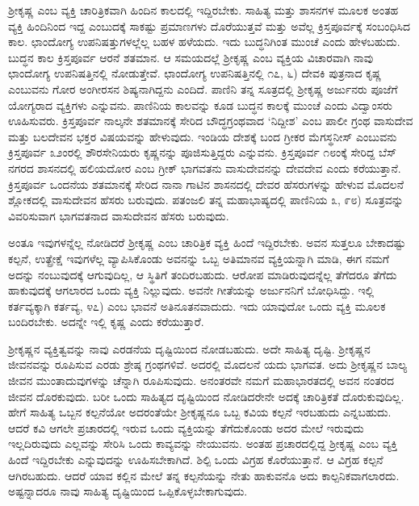 ಶ‍್ರೀಕೃಷ್ಣ ಎಂಬ ವ್ಯಕ್ತಿ ಚಾರಿತ್ರಿಕವಾಗಿ ಹಿಂದಿನ ಕಾಲದಲ್ಲಿ ಇದ್ದಿರಬೇಕು. ಸಾಹಿತ್ಯ ಮತ್ತು ಶಾಸನಗಳ ಮೂಲಕ ಅಂತಹ ವ್ಯಕ್ತಿ ಹಿಂದಿನಿಂದ ಇದ್ದ ಎಂಬುದಕ್ಕೆ ಸಾಕಷ್ಟು ಪ್ರಮಾಣಗಳು ದೊರೆಯುತ್ತವೆ ಮತ್ತು ಅವೆಲ್ಲ ಕ್ರಿಸ್ತಪೂರ್ವಕ್ಕೆ ಸಂಬಂಧಿಸಿದ ಕಾಲ. ಛಾಂದೋಗ್ಯ ಉಪನಿಷತ್ತು\-ಗಳಲ್ಲೆಲ್ಲ ಬಹಳ ಹಳೆಯದು. ಇದು ಬುದ್ಧನಿಗಿಂತ ಮುಂಚೆ ಎಂದು ಹೇಳಬಹುದು. ಬುದ್ಧನ ಕಾಲ ಕ್ರಿಸ್ತಪೂರ್ವ ಆರನೆ ಶತಮಾನ. ಆ ಸಮಯದಲ್ಲೆ ಶ‍್ರೀಕೃಷ್ಣ ಎಂಬ ವ್ಯಕ್ತಿಯ ವಿಚಾರವಾಗಿ ನಾವು ಛಾಂದೋಗ್ಯ ಉಪನಿಷತ್ತಿನಲ್ಲಿ ನೋಡುತ್ತೇವೆ. ಛಾಂದೋಗ್ಯ ಉಪನಿಷತ್ತಿನಲ್ಲಿ  ೧೭, ೬) ದೇವಕಿ ಪುತ್ರನಾದ ಕೃಷ್ಣ ಎಂಬುವನು ಗೋರ ಅಂಗೀರಸನ ಶಿಷ್ಯನಾಗಿದ್ದನು ಎಂದಿದೆ. ಪಾಣಿನಿ ತನ್ನ ಸೂತ್ರದಲ್ಲಿ ಶ‍್ರೀಕೃಷ್ಣ ಅರ್ಜುನರು ಪೂಜೆಗೆ ಯೋಗ್ಯರಾದ ವ್ಯಕ್ತಿಗಳು ಎನ್ನುವನು. ಪಾಣಿನಿಯ ಕಾಲವನ್ನು ಕೂಡ ಬುದ್ಧನ ಕಾಲಕ್ಕೆ ಮುಂಚೆ ಎಂದು ವಿದ್ವಾಂಸರು ಊಹಿಸುವರು. ಕ್ರಿಸ್ತಪೂರ್ವ ನಾಲ್ಕನೇ ಶತಮಾನಕ್ಕೆ ಸೇರಿದ ಬೌದ್ಧಗ್ರಂಥವಾದ ‘ನಿದ್ದೀಶ’ ಎಂಬ ಪಾಲೀ ಗ್ರಂಥ ವಾಸುದೇವ ಮತ್ತು ಬಲದೇವನ ಭಕ್ತರ ವಿಷಯವನ್ನು ಹೇಳುವುದು. ಇಂಡಿಯ ದೇಶಕ್ಕೆ ಬಂದ ಗ್ರೀಕರ ಮೆಗಸ್ಥನೀಸ್ ಎಂಬುವನು ಕ್ರಿಸ್ತಪೂರ್ವ ೩೨ಂರಲ್ಲಿ ಶೌರಸೇನಿಯರು ಕೃಷ್ಣನನ್ನು ಪೂಜಿಸುತ್ತಿದ್ದರು ಎನ್ನುವನು. ಕ್ರಿಸ್ತಪೂರ್ವ ೧೮ಂಕ್ಕೆ ಸೇರಿದ್ದ ಬೆಸ್ ನಗರದ ಶಾಸನದಲ್ಲಿ ಹಲಿಯದೋರ ಎಂಬ ಗ್ರೀಕ್ ಭಾಗವತನು ವಾಸುದೇವನನ್ನು ದೇವದೇವ ಎಂದು ಕರೆಯುತ್ತಾನೆ. ಕ್ರಿಸ್ತಪೂರ್ವ ಒಂದನೆಯ ಶತಮಾನಕ್ಕೆ ಸೇರಿದ ನಾನಾ ಗಾಟಿನ ಶಾಸನದಲ್ಲಿ ದೇವರ ಹೆಸರುಗಳನ್ನು ಹೇಳುವ ಮೊದಲನೆ ಶ್ಲೋಕದಲ್ಲಿ ವಾಸುದೇವನ ಹೆಸರು ಬರುವುದು. ಪತಂಜಲಿ ತನ್ನ ಮಹಾಭಾಷ್ಯದಲ್ಲಿ ಪಾಣಿನಿಯ  ೩, ೯೮) ಸೂತ್ರವನ್ನು ವಿವರಿಸುವಾಗ ಭಾಗವತನಾದ ವಾಸುದೇವನ ಹೆಸರು ಬರುವುದು.

ಅಂತೂ ಇವುಗಳನ್ನೆಲ್ಲ ನೋಡಿದರೆ ಶ‍್ರೀಕೃಷ್ಣ ಎಂಬ ಚಾರಿತ್ರಿಕ ವ್ಯಕ್ತಿ ಹಿಂದೆ ಇದ್ದಿರಬೇಕು. ಅವನ ಸುತ್ತಲೂ ಬೇಕಾದಷ್ಟು ಕಲ್ಪನೆ, ಉತ್ಪ್ರೇಕ್ಷೆ ಇವುಗಳೆಲ್ಲ ವ್ಯಾಪಿಸಿಕೊಂಡು ಅವನನ್ನು ಒಬ್ಬ ಅತಿಮಾನವ ವ್ಯಕ್ತಿಯನ್ನಾಗಿ ಮಾಡಿ, ಈಗ ನಮಗೆ ಅದನ್ನು ನಂಬುವುದಕ್ಕೆ ಆಗುವುದಿಲ್ಲ, ಆ ಸ್ಥಿತಿಗೆ ತಂದಿರಬಹುದು. ಆರೋಪ ಮಾಡಿರುವುದನ್ನೆಲ್ಲ ತೆಗೆದರೂ ತೆಗೆದು ಹಾಕುವುದಕ್ಕೆ ಆಗಲಾರದ ಒಂದು ವ್ಯಕ್ತಿ ನಿಲ್ಲುವುದು. ಅವನೇ ಗೀತೆಯನ್ನು ಅರ್ಜುನನಿಗೆ ಬೋಧಿಸಿದ್ದು. ಇಲ್ಲಿ ಕರ್ತವ್ಯಕ್ಕಾಗಿ ಕರ್ತವ್ಯ, ೪೭) ಎಂಬ ಭಾವನೆ ಅತಿನೂತನವಾದುದು. ಇದು ಯಾವುದೋ ಒಂದು ವ್ಯಕ್ತಿ ಮೂಲಕ ಬಂದಿರಬೇಕು. ಅದನ್ನೇ ಇಲ್ಲಿ ಕೃಷ್ಣ ಎಂದು ಕರೆಯುತ್ತಾರೆ.

ಶ‍್ರೀಕೃಷ್ಣನ ವ್ಯಕ್ತಿತ್ವವನ್ನು ನಾವು ಎರಡನೆಯ ದೃಷ್ಟಿಯಿಂದ ನೋಡಬಹುದು. ಅದೇ ಸಾಹಿತ್ಯ ದೃಷ್ಟಿ. ಶ‍್ರೀಕೃಷ್ಣನ ಜೀವನವನ್ನು ರೂಪಿಸುವ ಎರಡು ಶ್ರೇಷ್ಠ ಗ್ರಂಥಗಳಿವೆ. ಅದರಲ್ಲಿ ಮೊದಲನೆ ಯದು ಭಾಗವತ. ಅದು ಶ‍್ರೀಕೃಷ್ಣನ ಬಾಲ್ಯ ಜೀವನ ಮುಂತಾದುವುಗಳನ್ನು ಚೆನ್ನಾಗಿ ರೂಪಿಸುವುದು. ಅನಂತರವೇ ನಮಗೆ ಮಹಾಭಾರತದಲ್ಲಿ ಅವನ ನಂತರದ ಜೀವನ ದೊರಕುವುದು. ಬರೀ ಒಂದು ಸಾಹಿತ್ಯದ ದೃಷ್ಟಿಯಿಂದ ನೋಡಿದರೇನೇ ಅದಕ್ಕೆ ಚಾರಿತ್ರಿಕತೆ ದೊರುಕುವುದಿಲ್ಲ. ಹೇಗೆ ಸಾಹಿತ್ಯ ಒಬ್ಬನ ಕಲ್ಪನೆಯೋ ಅದರಂತೆಯೇ ಶ‍್ರೀಕೃಷ್ಣನೂ ಒಬ್ಬ ಕವಿಯ ಕಲ್ಪನೆ ಇರಬಹುದು ಎನ್ನಬಹುದು. ಆದರೆ ಕವಿ ಆಗಲೇ ಪ್ರಚಾರದಲ್ಲಿ ಇರುವ ಒಂದು ವ್ಯಕ್ತಿಯನ್ನು ತೆಗೆದುಕೊಂಡು ಅದರ ಮೇಲೆ ಇರುವುದು ಇಲ್ಲದಿರುವುದು ಎಲ್ಲವನ್ನು ಸೇರಿಸಿ ಒಂದು ಕಾವ್ಯವನ್ನು ನೇಯುವನು. ಅಂತಹ ಪ್ರಚಾರದಲ್ಲಿದ್ದ ಶ‍್ರೀಕೃಷ್ಣ ಎಂಬ ವ್ಯಕ್ತಿ ಹಿಂದೆ ಇದ್ದಿರಬೇಕು ಎನ್ನುವುದನ್ನು ಊಹಿಸಬೇಕಾಗಿದೆ. ಶಿಲ್ಪಿ ಒಂದು ವಿಗ್ರಹ ಕೊರೆಯುತ್ತಾನೆ. ಆ ವಿಗ್ರಹ ಕಲ್ಪನೆ ಆಗಿರಬಹುದು. ಆದರೆ ಯಾವ ಕಲ್ಲಿನ ಮೇಲೆ ತನ್ನ ಕಲ್ಪನೆಯನ್ನು ನೇತು ಹಾಕುವನೊ ಅದು ಕಾಲ್ಪನಿಕವಾಗಲಾರದು. ಅಷ್ಟನ್ನಾದರೂ ನಾವು ಸಾಹಿತ್ಯ ದೃಷ್ಟಿಯಿಂದ ಒಪ್ಪಿಕೊಳ್ಳಬೇಕಾಗುವುದು.

